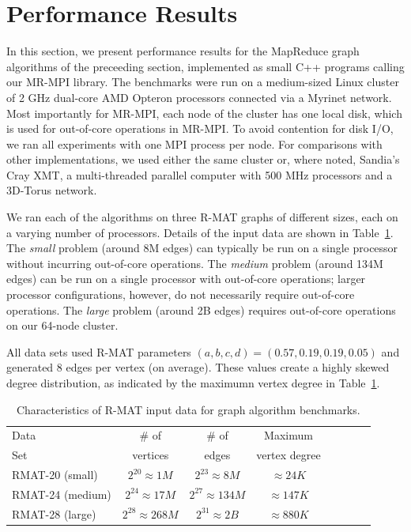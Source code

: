 \section{Performance Results}
\label{sec:results}

In this section, we present performance results for the MapReduce
graph algorithms of the preceeding section, implemented as small C++
programs calling our MR-MPI library.  The benchmarks were run on a
medium-sized Linux cluster of 2 GHz dual-core AMD Opteron processors
connected via a Myrinet network.  Most importantly for MR-MPI, each
node of the cluster has one local disk, which is used for out-of-core
operations in MR-MPI.  To avoid contention for disk I/O, we ran all
experiments with one MPI process per node.  For comparisons with other
implementations, we used either the same cluster or, where noted,
Sandia's Cray XMT, a multi-threaded parallel computer with 500 {MHz}
processors and a 3D-Torus network.

We ran each of the algorithms on three R-MAT graphs of different
sizes, each on a varying number of processors.  Details of the input
data are shown in Table~\ref{t:rmats}.  The {\it small} problem
(around 8M edges) can typically be run on a single processor without
incurring out-of-core operations.  The {\it medium} problem (around
134M edges) can be run on a single processor with out-of-core
operations; larger processor configurations, however, do not
necessarily require out-of-core operations.  The {\it large} problem
(around 2B edges) requires out-of-core operations on our 64-node
cluster.


All data sets used R-MAT parameters $(a, b, c, d) = (0.57, 0.19, 0.19,
0.05)$ and generated 8 edges per vertex (on average).  These values
create a highly skewed degree distribution, as indicated by the
maximumn vertex degree in Table~\ref{t:rmats}.

\begin{table}
\begin{center}
\begin{tabular}{|l|c|c|c|c|c|c|c|}
\hline
Data & \# of    & \# of & Maximum \\
Set  & vertices & edges & vertex degree\\
\hline
RMAT-20 (small)   &$2^{20} \approx 1M$ & $2^{23} \approx 8M$ &  $\approx 24K$ \\
RMAT-24 (medium)  &$2^{24} \approx 17M$ & $2^{27} \approx 134M$ &  $\approx 147K$ \\
RMAT-28 (large)   &$2^{28} \approx 268M$ & $2^{31} \approx 2B$& $\approx 880K$ \\
\hline
\end{tabular}
\caption{Characteristics of R-MAT input data for graph algorithm
benchmarks.}
\label{t:rmats}
\end{center}
\end{table}


